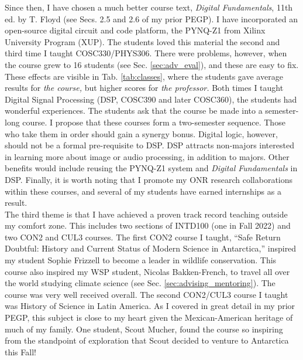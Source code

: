 \documentclass[../../../main.tex]{subfiles}
\begin{document}
Since then, I have chosen a much better course text, \textit{Digital Fundamentals}, 11th ed. by T. Floyd \cite{digitalFund} (see Secs. 2.5 and 2.6 of my prior PEGP).  I have incorporated an open-source digital circuit and code platform, the PYNQ-Z1 from Xilinx University Program (XUP).  The students loved this material the second and third time I taught COSC330/PHYS306.  There were problems, however, when the course grew to 16 students (see Sec. \ref{sec:adv_eval}), and these are easy to fix.  These effects are visible in Tab. \ref{tab:classes}, where the students gave average results for \textit{the course,} but higher scores for \textit{the professor.}  Both times I taught Digital Signal Processing (DSP, COSC390 and later COSC360), the students had wonderful experiences.  The students ask that the course be made into a semester-long course.  I propose that these courses form a two-semester sequence.  Those who take them in order should gain a synergy bonus.  Digital logic, however, should not be a formal pre-requisite to DSP.  DSP attracts non-majors interested in learning more about image or audio processing, in addition to majors.  Other benefits would include reusing the PYNQ-Z1 system and \textit{Digital Fundamentals} in DSP.  Finally, it is worth noting that I promote my ONR research collaborations within these courses, and several of my students have earned internships as a result.
\\
\vspace{0.25cm}
The third theme is that I have achieved a proven track record teaching outside my comfort zone.  This includes two sections of INTD100 (one in Fall 2022) and two CON2 and CUL3 courses.  The first CON2 course I taught, ``Safe Return Doubtful: History and Current Status of Modern Science in Antarctica,'' inspired my student Sophie Frizzell to become a leader in wildlife conservation.  This course also inspired my WSP student, Nicolas Bakken-French, to travel all over the world studying climate science (see Sec. \ref{sec:advising_mentoring}).  The course was very well received overall.  The second CON2/CUL3 course I taught was History of Science in Latin America.  As I covered in great detail in my prior PEGP, this subject is close to my heart given the Mexican-American heritage of much of my family.  One student, Scout Mucher, found the course so inspiring from the standpoint of exploration that Scout decided to venture to Antarctica this Fall!
\\
\vspace{0.25cm}
\end{document}
